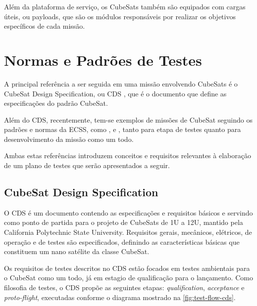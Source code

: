 Além da plataforma de serviço, os CubeSats também são equipados com cargas úteis, ou payloads, que são os módulos responsáveis por realizar os objetivos específicos de cada missão.

\section{Normas e Padrões de Testes}\label{sec:normas-ecss}

A principal referência a ser seguida em uma missão envolvendo CubeSats é o CubeSat Design Specification, ou \gls{CDS} \cite{cds}, que é o documento que define as especificações do padrão CubeSat.

Além do \gls{CDS}, recentemente, tem-se exemplos de missões de CubeSat seguindo os padrões e normas da \gls{ECSS}, como \textcite{floripasat-1}, \textcite{tailoring-ecss-nanosat} e \textcite{mist-eps}, tanto para etapa de testes quanto para desenvolvimento da missão como um todo.

Ambas estas referências introduzem conceitos e requisitos relevantes à elaboração de um plano de testes que serão apresentados a seguir.

\subsection{CubeSat Design Specification}

O \gls{CDS} é um documento contendo as especificações e requisitos básicos e servindo como ponto de partida para o projeto de CubeSats de 1U a 12U, mantido pela California Polytechnic State University.
Requisitos gerais, mecânicos, elétricos, de operação e de testes são especificados, definindo as características básicas que constituem um nano satélite da classe CubeSat.

Os requisitos de testes descritos no \gls{CDS} estão focados em testes ambientais para o CubeSat como um todo, já em estagio de qualificação para o lançamento.
Como filosofia de testes, o \gls{CDS} propõe as seguintes etapas: \textit{qualification}, \textit{acceptance} e \textit{proto-flight}, executadas conforme o diagrama mostrado na \autoref{fig:test-flow-cds}.

